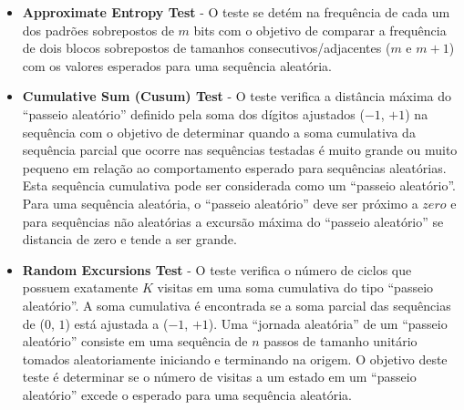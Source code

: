 \begin{itemize}
   \item \textbf{Approximate Entropy Test} - O teste se detém na frequência de cada um dos padrões sobrepostos de $m$ bits com o objetivo de comparar a frequência de dois blocos sobrepostos de tamanhos consecutivos/adjacentes ($m$ e $m+1$) com os valores esperados para uma sequência aleatória.
   \item \textbf{Cumulative Sum (Cusum) Test} - O teste verifica a distância máxima do ``passeio aleatório'' definido pela soma dos dígitos ajustados ($-1$, $+1$) na sequência com o objetivo de determinar quando a soma cumulativa da sequência parcial que ocorre nas sequências testadas é muito grande ou muito pequeno em relação ao comportamento esperado para sequências aleatórias. Esta sequência cumulativa pode ser considerada como um ``passeio aleatório''. Para uma sequência aleatória, o ``passeio aleatório'' deve ser próximo a $zero$ e para sequências não aleatórias a excursão máxima do ``passeio aleatório'' se distancia de zero e tende a ser grande.
   \item \textbf{Random Excursions Test} - O teste verifica o número de ciclos que possuem exatamente $K$ visitas em uma soma cumulativa do tipo ``passeio aleatório''. A soma cumulativa é encontrada se a soma parcial das sequências de ($0$, $1$) está ajustada a ($-1$, $+1$). Uma ``jornada aleatória'' de um ``passeio aleatório'' consiste em uma sequência de $n$ passos de tamanho unitário tomados aleatoriamente iniciando e terminando na origem. O objetivo deste teste é determinar se o número de visitas a um estado em um ``passeio aleatório'' excede o esperado para uma sequência aleatória.

\end{itemize}
